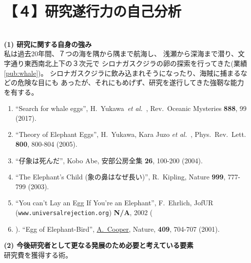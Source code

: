 \documentclass[11pt,a4paper,uplatex,dvipdfmx]{ujarticle} 		%
\newcommand{\研究課題名}{象の卵}
\newcommand{\研究機関名}{逢坂大学}
\newcommand{\研究代表者氏名}{湯川秀樹}
\newcommand{\paper}[6]{%
	\item ``#1'', #2, #3 {\bf #4}, #5 (#6).			%
}
\newcommand{\etal}{\textit{et al.\ }}
\newcommand{\yukawa}{H.~Yukawa}					%
\newcommand{\prl}{Phys.\ Rev.\ Lett.\ }		%
\begin{document}
        \nolinenumbers




\section{【４】研究遂行力の自己分析}

\SelfReviewInstructions\\%
\noindent
\textbf{(1) 研究に関する自身の強み}\\
	私は過去20年間、７つの海を隅から隅まで航海し、
	浅瀬から深海まで潜り、文字通り東西南北上下の３次元で
	シロナガスクジラの卵の探索を行ってきた(業績\ref{pub:whale})。		%
	シロナガスクジラに飲み込まれそうになったり、海賊に捕まるなどの危険な目にも
	あったが、それにもめげず、研究を遂行してきた強靭な能力を有する。
	\begin{enumerate}
		\paper{Search for whale eggs}{\yukawa\ \etal}{Rev.\ Oceanic Mysteries}{888}{99}{2017}
			\label{pub:whale}
				
		\paper{Theory of Elephant Eggs}{\yukawa, Kara Juzo \etal}{\prl}{800}{800-804}{2005}
			\label{pub:theoegg}
				
		\paper{仔象は死んだ}{Kobo Abe}{安部公房全集}{26}{100-200}{2004}
		
		\paper{The Elephant's Child (象の鼻はなぜ長い)}{R.~Kipling}{Nature}{999}{777-799}{2003}

		\paper{You can't Lay an Egg If You're an Elephant}{F.~Ehrlich}
			{JofUR\\({\tt www.universalrejection.org})}{{\bf N/A}}{2002}
		
		\item ``Egg of Elephant-Bird'', 
				\underline{A.~Cooper},
				Nature, {\bf 409}, 704-707 (2001).	%
	\end{enumerate}

\vspace{5mm}
\noindent
\textbf{(2) 今後研究者として更なる発展のため必要と考えている要素}\\
研究費を獲得する術。



\end{document}
